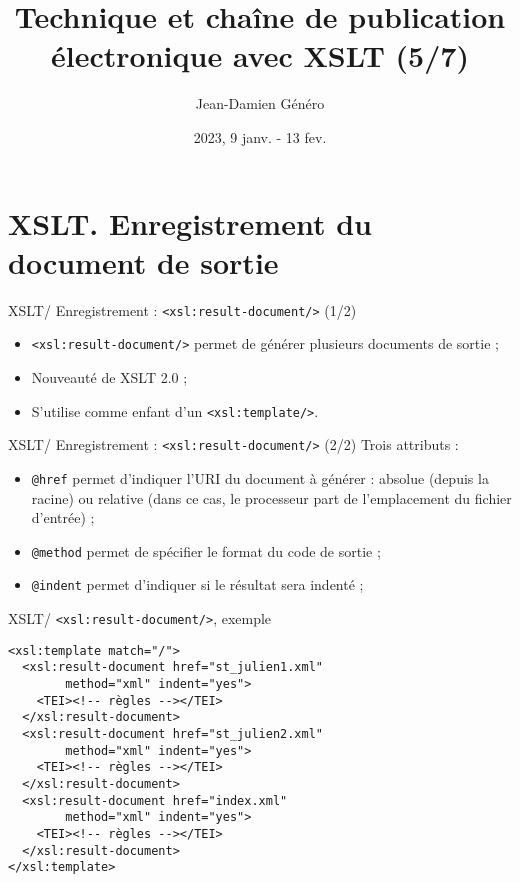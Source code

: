 \documentclass{beamer}
\title{Technique et chaîne de publication électronique avec XSLT (5/7)}
\date{2023, 9 janv. - 13 fev.}
\author{Jean-Damien Généro}
\institute{École nationale des chartes -- M2 TNAH}
\begin{document}
    \maketitle

    \section{XSLT. Enregistrement du document de sortie}

    \begin{frame}{XSLT/ Enregistrement : \texttt{<xsl:result-document/>} (1/2)}
        \Large
        \begin{itemize}
            \item \texttt{<xsl:result-document/>} permet de générer plusieurs documents de sortie ; 
            \item Nouveauté de XSLT 2.0 ;
            \item S'utilise comme enfant d'un \texttt{<xsl:template/>}.
        \end{itemize}
    \end{frame}

    \begin{frame}{XSLT/ Enregistrement : \texttt{<xsl:result-document/>} (2/2)}
        \Large
        Trois attributs :
        \begin{itemize}
            \item \texttt{@href} permet d'indiquer l'URI du document à générer : absolue (depuis la racine) ou relative (dans ce cas, le processeur part de l'emplacement du fichier d'entrée) ;
            \item \texttt{@method} permet de spécifier le format du code  de sortie ;
            \item \texttt{@indent} permet d'indiquer si le résultat sera indenté ;
        \end{itemize}
    \end{frame}

    \begin{frame}[fragile]{XSLT/ \texttt{<xsl:result-document/>}, exemple}
        \begin{verbatim}
<xsl:template match="/">
  <xsl:result-document href="st_julien1.xml"
        method="xml" indent="yes">
    <TEI><!-- règles --></TEI>
  </xsl:result-document>
  <xsl:result-document href="st_julien2.xml"
        method="xml" indent="yes">
    <TEI><!-- règles --></TEI>
  </xsl:result-document>
  <xsl:result-document href="index.xml"
        method="xml" indent="yes">
    <TEI><!-- règles --></TEI>
  </xsl:result-document>
</xsl:template>
        \end{verbatim}
    \end{frame}
\end{document}
